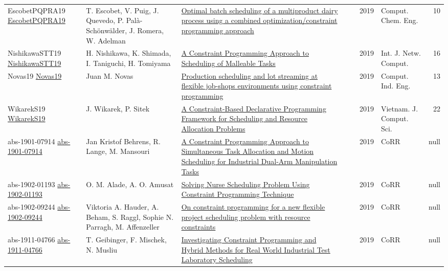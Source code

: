 {\begin{longtable}{p{3cm}p{6cm}p{7cm}rrrp{3cm}r}
EscobetPQPRA19 \href{https://doi.org/10.1016/j.compchemeng.2018.08.040}{EscobetPQPRA19} & T. Escobet, V. Puig, J. Quevedo, P. Pal{\`{a}}{-}Sch{\"{o}}nw{\"{a}}lder, J. Romera, W. Adelman & \href{articles/EscobetPQPRA19.pdf}{Optimal batch scheduling of a multiproduct dairy process using a combined optimization/constraint programming approach} &  & \cite{EscobetPQPRA19} & 2019 & Comput. Chem. Eng. & 10\\
NishikawaSTT19 \href{http://www.ijnc.org/index.php/ijnc/article/view/201}{NishikawaSTT19} & H. Nishikawa, K. Shimada, I. Taniguchi, H. Tomiyama & \href{}{A Constraint Programming Approach to Scheduling of Malleable Tasks} &  & \cite{NishikawaSTT19} & 2019 & Int. J. Netw. Comput. & 16\\
Novas19 \href{https://doi.org/10.1016/j.cie.2019.07.011}{Novas19} & Juan M. Novas & \href{articles/Novas19.pdf}{Production scheduling and lot streaming at flexible job-shops environments using constraint programming} &  & \cite{Novas19} & 2019 & Comput. Ind. Eng. & 13\\
WikarekS19 \href{https://doi.org/10.1142/S2196888819500027}{WikarekS19} & J. Wikarek, P. Sitek & \href{articles/WikarekS19.pdf}{A Constraint-Based Declarative Programming Framework for Scheduling and Resource Allocation Problems} &  & \cite{WikarekS19} & 2019 & Vietnam. J. Comput. Sci. & 22\\
abs-1901-07914 \href{http://arxiv.org/abs/1901.07914}{abs-1901-07914} & Jan Kristof Behrens, R. Lange, M. Mansouri & \href{articles/abs-1901-07914.pdf}{A Constraint Programming Approach to Simultaneous Task Allocation and Motion Scheduling for Industrial Dual-Arm Manipulation Tasks} &  & \cite{abs-1901-07914} & 2019 & CoRR & null\\
abs-1902-01193 \href{http://arxiv.org/abs/1902.01193}{abs-1902-01193} & O. M. Alade, A. O. Amusat & \href{articles/abs-1902-01193.pdf}{Solving Nurse Scheduling Problem Using Constraint Programming Technique} &  & \cite{abs-1902-01193} & 2019 & CoRR & null\\
abs-1902-09244 \href{http://arxiv.org/abs/1902.09244}{abs-1902-09244} & Viktoria A. Hauder, A. Beham, S. Raggl, Sophie N. Parragh, M. Affenzeller & \href{articles/abs-1902-09244.pdf}{On constraint programming for a new flexible project scheduling problem with resource constraints} &  & \cite{abs-1902-09244} & 2019 & CoRR & null\\
abs-1911-04766 \href{http://arxiv.org/abs/1911.04766}{abs-1911-04766} & T. Geibinger, F. Mischek, N. Musliu & \href{articles/abs-1911-04766.pdf}{Investigating Constraint Programming and Hybrid Methods for Real World Industrial Test Laboratory Scheduling} &  & \cite{abs-1911-04766} & 2019 & CoRR & null\\

\end{longtable}}
